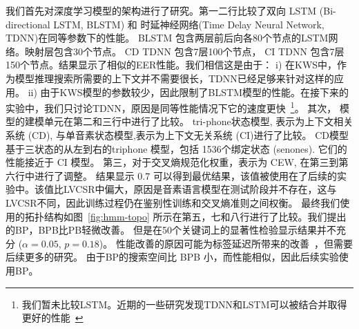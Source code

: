 我们首先对深度学习模型的架构进行了研究。第一二行比较了双向 LSTM (Bi-directional LSTM, BLSTM) 和 时延神经网络(Time Delay Neural Network, TDNN)在同等参数下的性能。 BLSTM 包含两层前后向各80个节点的LSTM网络。映射层包含30个节点。 CD TDNN 包含7层100个节点， CI TDNN 包含7层150个节点。结果显示了相似的EER性能。我们相信这是由于： i) 在KWS中，作为模型推理搜索所需要的上下文并不需要很长，TDNN已经足够来针对这样的应用。 ii) 由于KWS模型的参数较少，因此限制了BLSTM模型的性能。在接下来的实验中，我们只讨论TDNN，原因是同等性能情况下它的速度更快~\footnote{我们暂未比较LSTM。近期的一些研究发现TDNN和LSTM可以被结合并取得更好的性能~\cite{tdnnlstm}}。
其次， 模型的建模单元在第二和三行中进行了比较。 tri-phone状态模型, 表示为上下文相关系统 (CD), 与单音素状态模型,表示为上下文无关系统 (CI)进行了比较。
CD模型基于三状态的从左到右的triphone 模型，包括 1536个绑定状态 (senones). 
它们的性能接近于 CI 模型。 %
第三，对于交叉熵规范化权重，表示为 CEW, 在第三到第六行中进行了调整。
结果显示 $0.7$ 可以得到最优结果，该值被使用在了后续的实验中。该值比LVCSR中偏大，原因是音素语言模型在测试阶段并不存在，这与LVCSR不同，因此训练过程仍在鉴别性训练和交叉熵准则之间权衡。
最终我们使用的拓扑结构如图~\ref{fig:hmm-topo} 
%
所示在第五，七和八行进行了比较。我们提出的BP，BPB比PB\cite{povey2016purely}轻微改善。 
但是在50个关键词上的显著性检验显示结果并不充分 ($\alpha=0.05$, $p=0.18$)。 
性能改善的原因可能为标签延迟所带来的改善~\cite{amodei2015deep}，但需要后续更多的研究。 
由于BP的搜索空间比 BPB 小，而性能相似，因此后续实验使用BP。

